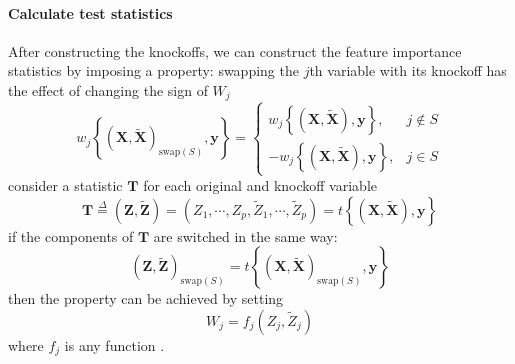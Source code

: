 \documentclass[twoside]{article}
\begin{document}
\paragraph*{Calculate test statistics}
After constructing the knockoffs, we can construct the feature importance statistics by imposing a  property: swapping the $j$th variable with its knockoff has the effect of changing the sign of $W_j$ 
$$
 w_j\left\{ (\mathbf{X},\tilde{\mathbf{X}})_{\mathrm{swap}(S)},\mathbf{y} \right\} = \begin{cases}
    w_j\left\{ (\mathbf{X},\tilde{\mathbf{X}}),\mathbf{y} \right\}, & j\not\in S \\
    -w_j \left\{ (\mathbf{X},\tilde{\mathbf{X}}),\mathbf{y} \right\}, & j\in S
 \end{cases}
$$
consider a statistic $\mathbf{T}$ for each original and knockoff variable $$ \mathbf{T} \overset{\Delta}{=} (\mathbf{Z},\tilde{\mathbf{Z}}) = (Z_1,\cdots,Z_p,\tilde{Z}_1,\cdots,\tilde{Z}_p) = t\left\{ (\mathbf{X},\tilde{\mathbf{X}}), \mathbf{y}\right\} $$
if the components of $\mathbf{T}$ are switched in the same way: $$ (\mathbf{Z},\tilde{\mathbf{Z}})_{\mathrm{swap}(S)} = t\left\{ (\mathbf{X},\tilde{\mathbf{X}})_{\mathrm{swap}(S)},\mathbf{y} \right\} $$
then the  property can be achieved by setting $$W_j = f_j(Z_j,\tilde{Z}_j)$$ where $f_j$ is any  function .
\end{document}
